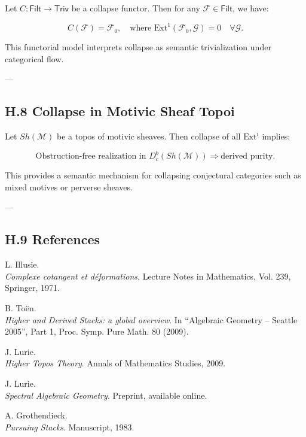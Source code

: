 \documentclass[11pt]{article}
\begin{document}
Let $C: \mathsf{Filt} \to \mathsf{Triv}$ be a collapse functor.  
Then for any $\mathcal{F} \in \mathsf{Filt}$, we have:

\[
C(\mathcal{F}) = \mathcal{F}_0, \quad \text{where } \mathrm{Ext}^1(\mathcal{F}_0, \mathcal{G}) = 0 \quad \forall \mathcal{G}.
\]

This functorial model interprets collapse as semantic trivialization under categorical flow.

---

\subsection*{H.8 Collapse in Motivic Sheaf Topoi}

Let $Sh(\mathcal{M})$ be a topos of motivic sheaves.  
Then collapse of all $\mathrm{Ext}^i$ implies:

\[
\text{Obstruction-free realization in } D^b_c(Sh(\mathcal{M})) \Rightarrow \text{derived purity}.
\]

This provides a semantic mechanism for collapsing conjectural categories such as mixed motives or perverse sheaves.

---

\subsection*{H.9 References}

\begin{thebibliography}{9}

L. Illusie.\\
\textit{Complexe cotangent et déformations}.  
Lecture Notes in Mathematics, Vol. 239, Springer, 1971.

B. Toën.\\
\textit{Higher and Derived Stacks: a global overview}.  
In “Algebraic Geometry – Seattle 2005”, Part 1, Proc. Symp. Pure Math. 80 (2009).

J. Lurie.\\
\textit{Higher Topos Theory}.  
Annals of Mathematics Studies, 2009.

J. Lurie.\\
\textit{Spectral Algebraic Geometry}.  
Preprint, available online.

A. Grothendieck.\\
\textit{Pursuing Stacks}.  
Manuscript, 1983.

\end{thebibliography}
\end{document}

